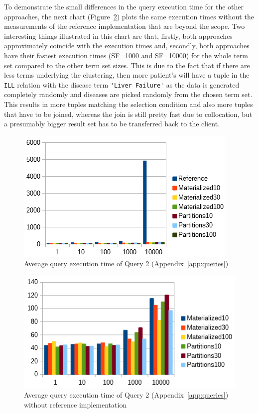To demonstrate the small differences in the query execution time for the other approaches, the next chart (Figure~\ref{fig:query2withoutref}) plots the same
execution times without the measurements of the reference implementation that are beyond the scope. Two interesting things illustrated in this chart are that,
firstly, both approaches approximately coincide with the execution times and, secondly, both approaches have their fastest execution times (SF=1000 and SF=10000)
for the whole term set compared to the other term set sizes. This is due to the fact that if there are less terms underlying the clustering, then more patient's 
will have a tuple in the \verb!ILL! relation with the disease term \verb!'Liver Failure'! as the data is generated completely randomly and diseases are picked 
randomly from the chosen term set. This results in more tuples matching the selection condition and also more tuples that have to be joined, whereas the 
join is still pretty fast due to collocation, but a presumably bigger result set has to be transferred back to the client.
\begin{figure}[h]
    \centering
    \includegraphics[scale=0.88]{charts/Query2.png}
    \caption{Average query execution time of Query 2 (Appendix~\ref{app:queries})}
    \label{fig:query2}
\end{figure}
\begin{figure}[h]
    \centering
    \includegraphics[scale=0.88]{charts/Query2WithoutReference.png}
    \caption{Average query execution time of Query 2 (Appendix~\ref{app:queries}) without reference implementation}
    \label{fig:query2withoutref}
\end{figure}


